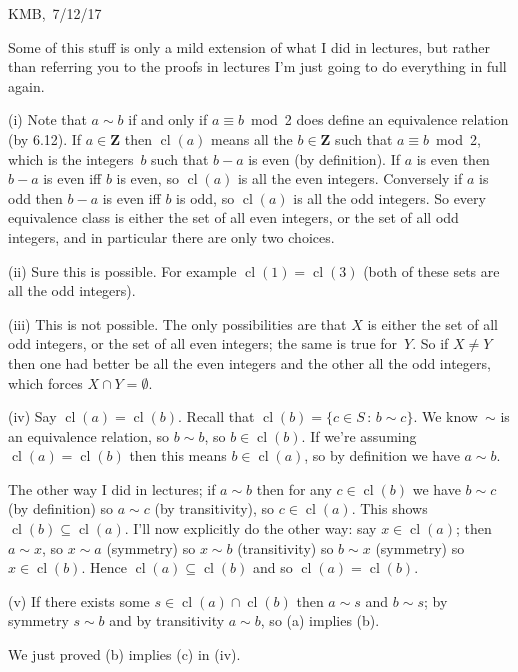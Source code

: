 \documentclass[10pt]{article}
\DeclareMathOperator{\cl}{cl}
\newcommand{\Z}{\mathbf{Z}}
\begin{document}
\begin{flushright} KMB,\ 7/12/17\end{flushright}


\medskip{} Some of this stuff is only a mild extension of what I did in lectures, but rather than referring you to the proofs in lectures I'm just going to do everything in full again.

(i) Note that $a\sim b$ if and only if $a\equiv b$~mod~2 does define an equivalence relation (by 6.12). If $a\in\Z$ then $\cl(a)$ means all the $b\in\Z$ such that $a\equiv b$~mod~2, which is the integers~$b$ such that $b-a$ is even (by definition). If $a$ is even then $b-a$ is even iff $b$ is even, so $\cl(a)$ is all the even integers. Conversely if $a$ is odd then $b-a$ is even iff $b$ is odd, so $\cl(a)$ is all the odd integers. So every equivalence class is either the set of all even integers, or the set of all odd integers, and in particular there are only two choices.

(ii) Sure this is possible. For example $\cl(1)=\cl(3)$ (both of these sets are all the odd integers).

(iii) This is not possible. The only possibilities are that $X$ is either the set of all odd integers, or the set of all even integers; the same is true for~$Y$. So if $X\not=Y$ then one had better be all the even integers and the other all the odd integers, which forces $X\cap Y=\emptyset$.

(iv) Say $\cl(a)=\cl(b)$. Recall that $\cl(b)=\{c\in S\,:\, b\sim c\}$. We know~$\sim$ is an equivalence relation, so $b\sim b$, so $b\in\cl(b)$. If we're assuming $\cl(a)=\cl(b)$ then this means $b\in\cl(a)$, so by definition we have $a\sim b$.

The other way I did in lectures; if $a\sim b$ then for any $c\in\cl(b)$ we have $b\sim c$ (by definition) so $a\sim c$ (by transitivity), so $c\in\cl(a)$. This shows $\cl(b)\subseteq\cl(a)$. I'll now explicitly do the other way: say $x\in\cl(a)$; then $a\sim x$, so $x\sim a$ (symmetry) so $x\sim b$ (transitivity) so $b\sim x$ (symmetry) so $x\in\cl(b)$. Hence $\cl(a)\subseteq\cl(b)$ and so $\cl(a)=\cl(b)$.

(v) If there exists some $s\in\cl(a)\cap\cl(b)$ then $a\sim s$ and $b\sim s$; by symmetry $s\sim b$ and by transitivity $a\sim b$, so (a) implies (b). 

We just proved (b) implies (c) in (iv).
\end{document}
